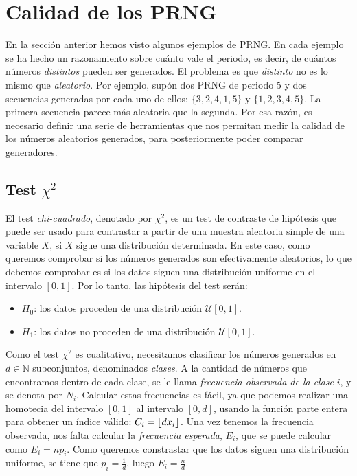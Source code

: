 \section{Calidad de los PRNG}

En la sección anterior hemos visto algunos ejemplos de PRNG. En cada ejemplo se ha hecho un razonamiento sobre cuánto vale el  periodo, es decir, de cuántos números \textit{distintos} pueden ser generados. El problema es que \textit{distinto} no es lo mismo que \textit{aleatorio}. Por ejemplo, supón dos PRNG de periodo 5 y dos secuencias generadas por cada uno de ellos: $\{3,2,4,1,5\}$ y $\{1,2,3,4,5\}$. La primera secuencia parece más aleatoria que la segunda. Por esa razón, es necesario definir una serie de herramientas que nos permitan medir la calidad de los números aleatorios generados, para posteriormente poder comparar generadores.

\subsection{Test $\chi^2$}

El test \textit{chi-cuadrado}, denotado por $\chi^2$, es un test de contraste de hipótesis que puede ser usado para contrastar a partir de una muestra aleatoria simple de una variable $X$, si $X$ sigue una distribución determinada. En este caso, como queremos comprobar si los números generados son efectivamente aleatorios, lo que debemos comprobar es si los datos siguen una distribución uniforme en el intervalo $[0,1]$. Por lo tanto, las hipótesis del test serán:
\begin{itemize}
\item $H_0$: los datos proceden de una distribución $\mathcal{U}[0,1]$.
\item $H_1$: los datos no proceden de una distribución $\mathcal{U}[0,1]$.
\end{itemize}
Como el test $\chi^2$ es cualitativo, necesitamos clasificar los números generados en $d\in\mathbb{N}$ subconjuntos, denominados \textit{clases}. A la cantidad de números que encontramos dentro de cada clase, se le llama \textit{frecuencia observada de la clase} $i$, y se denota por $N_i$. Calcular estas frecuencias es fácil, ya que podemos realizar una homotecia del intervalo $[0,1]$ al intervalo $[0,d]$, usando la función parte entera para obtener un índice válido: $C_i=\left\lfloor d x_i \right\rfloor$. Una vez tenemos la frecuencia observada, nos falta calcular la \textit{frecuencia esperada}, $E_i$, que se puede calcular como $E_i=np_i$. Como queremos constrastar que los datos siguen una distribución uniforme, se tiene que $p_i=\frac{1}{d}$, luego $E_i=\frac{n}{d}$. 

